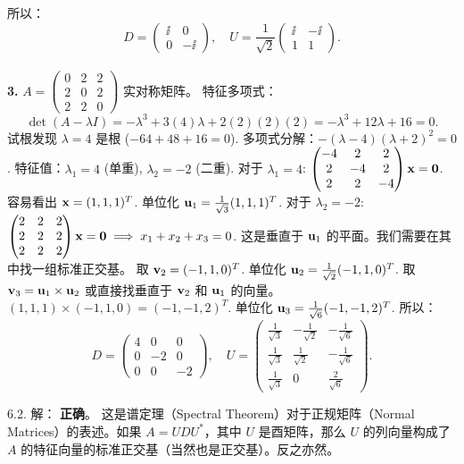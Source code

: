 \begin{exer}
所以：
$$ D = \begin{pmatrix} \ii & 0 \\ 0 & -\ii \end{pmatrix}, \quad U = \frac{1}{\sqrt{2}} \begin{pmatrix} \ii & -\ii \\ 1 & 1 \end{pmatrix}. $$
\\
\textbf{3. } $A = \begin{pmatrix} 0 & 2 & 2 \\ 2 & 0 & 2 \\ 2 & 2 & 0 \end{pmatrix}$
实对称矩阵。
特征多项式：
$$ \det(A-\lambda I) = -\lambda^3 + 3(4)\lambda + 2(2)(2)(2) = -\lambda^3 + 12\lambda + 16 = 0. $$
试根发现 $\lambda = 4$ 是根 ($-64 + 48 + 16 = 0$).
多项式分解：$-(\lambda - 4)(\lambda + 2)^2 = 0$.
特征值：$\lambda_1 = 4$ (单重), $\lambda_2 = -2$ (二重).
对于 $\lambda_1 = 4$: $\begin{pmatrix} -4 & 2 & 2 \\ 2 & -4 & 2 \\ 2 & 2 & -4 \end{pmatrix} \mathbf{x} = \mathbf{0}$. 容易看出 $\mathbf{x} = (1, 1, 1)^T$. 单位化 $\mathbf{u}_1 = \frac{1}{\sqrt{3}}(1, 1, 1)^T$.
对于 $\lambda_2 = -2$: $\begin{pmatrix} 2 & 2 & 2 \\ 2 & 2 & 2 \\ 2 & 2 & 2 \end{pmatrix} \mathbf{x} = \mathbf{0} \implies x_1 + x_2 + x_3 = 0$.
这是垂直于 $\mathbf{u}_1$ 的平面。我们需要在其中找一组标准正交基。
取 $\mathbf{v}_2 = (-1, 1, 0)^T$. 单位化 $\mathbf{u}_2 = \frac{1}{\sqrt{2}}(-1, 1, 0)^T$.
取 $\mathbf{v}_3 = \mathbf{u}_1 \times \mathbf{u}_2$ 或直接找垂直于 $\mathbf{v}_2$ 和 $\mathbf{u}_1$ 的向量。$(1, 1, 1) \times (-1, 1, 0) = (-1, -1, 2)^T$.
单位化 $\mathbf{u}_3 = \frac{1}{\sqrt{6}}(-1, -1, 2)^T$.
所以：
$$ D = \begin{pmatrix} 4 & 0 & 0 \\ 0 & -2 & 0 \\ 0 & 0 & -2 \end{pmatrix}, \quad U = \begin{pmatrix} \frac{1}{\sqrt{3}} & -\frac{1}{\sqrt{2}} & -\frac{1}{\sqrt{6}} \\ \frac{1}{\sqrt{3}} & \frac{1}{\sqrt{2}} & -\frac{1}{\sqrt{6}} \\ \frac{1}{\sqrt{3}} & 0 & \frac{2}{\sqrt{6}} \end{pmatrix}. $$

6.2. 解： \textbf{正确}。
这是谱定理（Spectral Theorem）对于正规矩阵（Normal Matrices）的表述。如果 $A = UDU^*$，其中 $U$ 是酉矩阵，那么 $U$ 的列向量构成了 $A$ 的特征向量的标准正交基（当然也是正交基）。反之亦然。


\end{exer}
